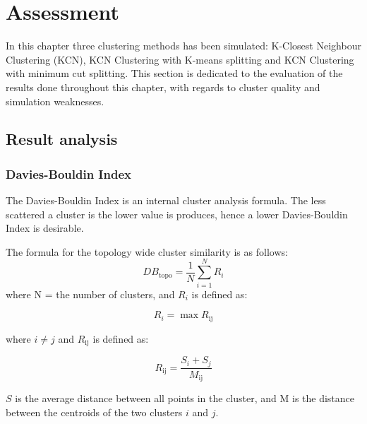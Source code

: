 \section{Assessment}
In this chapter three clustering methods has been simulated: K-Closest Neighbour Clustering (KCN), KCN Clustering with K-means splitting
and KCN Clustering with minimum cut splitting. This section is dedicated to the evaluation of the results done throughout this chapter, with regards to cluster quality and simulation weaknesses.

\subsection{Result analysis}

\subsubsection{Davies-Bouldin Index}
\label{chap:bouldin}

The Davies-Bouldin Index \cite{Bouldin} is an internal cluster analysis formula. The less scattered a cluster is the lower value is produces, hence a lower Davies-Bouldin Index is desirable.

The formula for the topology wide cluster similarity is as follows:
\[
	DB_\text{topo} = \frac{1}{N}\sum_{i=1}^{N} R_i
\]	
where N = the number of clusters, and $R_i$ is defined as: 

\[
	R_i= \max R_\text{ij} 
\]	

where $i \neq j$ and $R_\text{ij}$ is defined as: 

\[
	R_\text{ij}= \frac{S_i + S_j}{M_\text{ij}} 
\]	

$S$ is the average distance between all points in the cluster, and M is the distance between the centroids of the two clusters $i$ and $j$.

